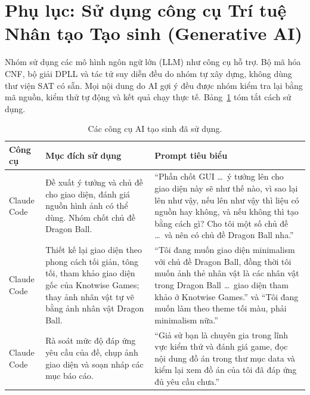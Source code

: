 \documentclass[12pt,a4paper]{article}
\begin{document}
    \appendix
    \section{Phụ lục: Sử dụng công cụ Trí tuệ Nhân tạo Tạo sinh (Generative AI)}
Nhóm sử dụng các mô hình ngôn ngữ lớn (LLM) như công cụ hỗ trợ. Bộ mã hóa CNF, bộ giải DPLL và tác tử suy diễn đều do nhóm tự xây dựng, không dùng thư viện SAT có sẵn. Mọi nội dung do AI gợi ý đều được nhóm kiểm tra lại bằng mã nguồn, kiểm thử tự động và kết quả chạy thực tế. Bảng~\ref{tab:genai} tóm tắt cách sử dụng.

\begin{table}[H]
\centering
\small
\renewcommand{\arraystretch}{1.3}
\begin{tabular}{@{}p{} p{} p{}@{}}
\toprule
\textbf{Công cụ} & \textbf{Mục đích sử dụng} & \textbf{Prompt tiêu biểu} \\
\midrule
Claude Code & Đề xuất ý tưởng và chủ đề cho giao diện, đánh giá nguồn hình ảnh có thể dùng. Nhóm chốt chủ đề Dragon Ball. & ``Phần chốt GUI \ldots\ ý tưởng lên cho giao diện này sẽ như thế nào, vì sao lại lên như vậy, nếu lên như vậy thì liệu có nguồn hay không, và nếu không thì tạo bằng cách gì? Cho tôi một số chủ đề \ldots\ và nên có chủ đề Dragon Ball nha.'' \\
Claude Code & Thiết kế lại giao diện theo phong cách tối giản, tông tối, tham khảo giao diện gốc của Knotwise Games; thay ảnh nhân vật tự vẽ bằng ảnh nhân vật Dragon Ball. & ``Tôi đang muốn giao diện minimalism với chủ đề Dragon Ball, đồng thời tôi muốn ảnh thẻ nhân vật là các nhân vật trong Dragon Ball \ldots\ giao diện tham khảo ở Knotwise Games.'' và ``Tôi đang muốn làm theo theme tối màu, phải minimalism nữa.'' \\
Claude Code & Rà soát mức độ đáp ứng yêu cầu của đề, chụp ảnh giao diện và soạn nháp các mục báo cáo. & ``Giả sử bạn là chuyên gia trong lĩnh vực kiểm thử và đánh giá game, đọc nội dung đồ án trong thư mục data và kiểm lại xem đồ án của tôi đã đáp ứng đủ yêu cầu chưa.'' \\
\bottomrule
\end{tabular}
\caption{Các công cụ AI tạo sinh đã sử dụng.}
\label{tab:genai}
\end{table}
\end{document}
